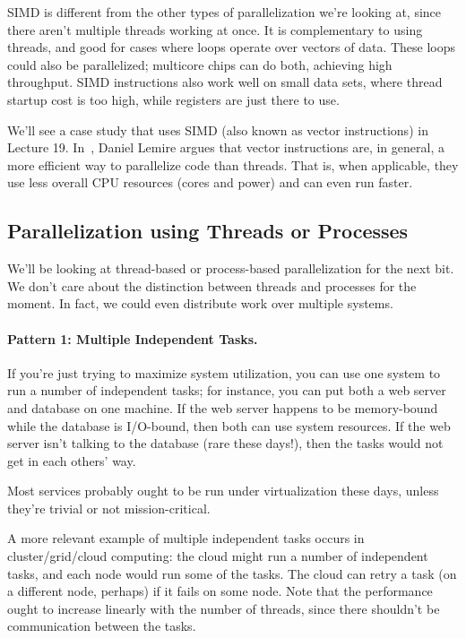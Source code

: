 \documentclass[a4paper]{report}
\begin{document}
SIMD is different from the other types of parallelization we're
looking at, since there aren't multiple threads working at once.
It is complementary to using threads, and good for cases
where loops operate over vectors of data. These loops could also be
parallelized; multicore chips can do both, achieving high throughput.
SIMD instructions also work well on small data sets, where thread startup
cost is too high, while registers are just there to use.

We'll see a case study that uses SIMD (also known as vector
instructions) in Lecture 19. In~\cite{lemire18:_multic_simd}, Daniel Lemire argues that vector
instructions are, in general, a more efficient way to parallelize code
than threads. That is, when applicable, they use less overall CPU
resources (cores and power) and can even run faster.

\subsection*{Parallelization using Threads or Processes}
We'll be looking at thread-based or process-based parallelization for the
next bit. We don't care about the distinction between threads and processes
for the moment. In fact, we could even distribute work over multiple systems.

\paragraph{Pattern 1: Multiple Independent Tasks.} If you're just trying to maximize
system utilization, you can use one system to run a number of independent
tasks; for instance, you can put both a web server and database on
one machine. If the web server happens to be memory-bound while the
database is I/O-bound, then both can use system resources. If the web
server isn't talking to the database (rare these days!), then the tasks
would not get in each others' way.

Most services probably ought to be run under virtualization these
days, unless they're trivial or not mission-critical.

A more relevant example of multiple independent tasks occurs in
cluster/grid/cloud computing: the cloud might run a number of
independent tasks, and each node would run some of the tasks. The
cloud can retry a task (on a different node, perhaps) if it fails on
some node. Note that the performance ought to increase linearly with
the number of threads, since there shouldn't be communication between
the tasks.
\end{document}
